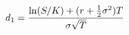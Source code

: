 \documentclass[preview]{standalone}
\begin{document}
\begin{align*}
\special{dvisvgm:raw <g id='unique000'>}d_1 = \frac{\ln(S/K) + (r + \frac{1}{2}\sigma^2)T}{\sigma \sqrt{T}}\special{dvisvgm:raw </g>}
\end{align*}
\end{document}
